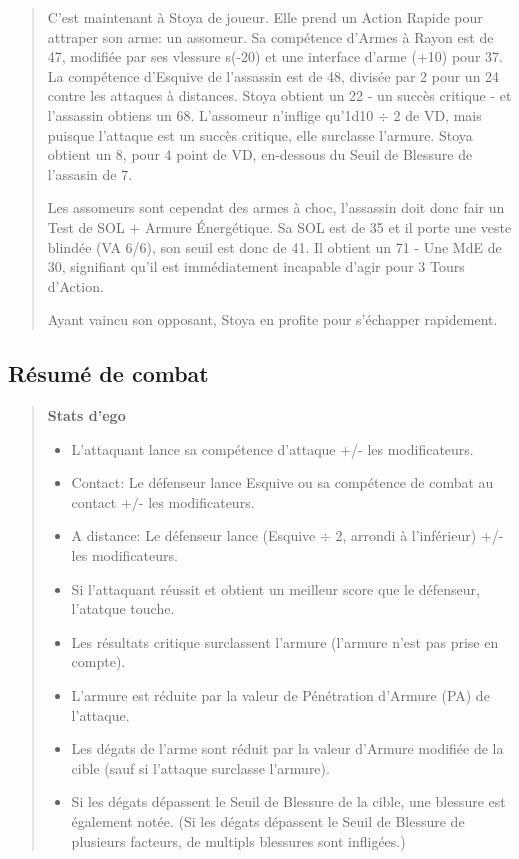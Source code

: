 \begin{quotation}
C'est maintenant à Stoya de joueur. Elle prend un Action Rapide pour attraper son arme: un assomeur. Sa compétence d'Armes à Rayon est de 47, modifiée par ses vlessure s(-20) et une interface d'arme (+10) pour 37. La compétence d'Esquive de l'assassin est de 48, divisée par 2 pour un 24 contre les attaques à distances. Stoya obtient un 22 - un succès critique - et l'assassin obtiens un 68. L'assomeur n'inflige qu'1d10 $\div$ 2 de VD, mais puisque l'attaque est un succès critique, elle surclasse l'armure. Stoya obtient un 8, pour 4 point de VD, en-dessous du Seuil de Blessure de l'assasin de 7. 

Les assomeurs sont cependat des armes à choc, l'assassin doit donc fair un Test de SOL + Armure Énergétique. Sa SOL est de 35 et il porte une veste blindée (VA 6/6), son seuil est donc de 41. Il obtient un 71 - Une MdE de 30, signifiant qu'il est immédiatement incapable d'agir pour 3 Tours d'Action. 

Ayant vaincu son opposant, Stoya en profite pour s'échapper rapidement. \end{quotation} 

\subsection{Résumé de combat} 

\begin{quotation} \textbf{Stats d'ego} \begin{itemize} \item L'attaquant lance sa compétence d'attaque +/- les modificateurs. \item Contact: Le défenseur lance Esquive ou sa compétence de combat au contact +/- les modificateurs. \item A distance: Le défenseur lance (Esquive $\div$ 2, arrondi à l'inférieur) +/- les modificateurs. \item Si l'attaquant réussit et obtient un meilleur score que le défenseur, l'atatque touche. \item Les résultats critique surclassent l'armure (l'armure n'est pas prise en compte). \item L'armure est réduite par la valeur de Pénétration d'Armure (PA) de l'attaque. \item Les dégats de l'arme sont réduit par la valeur d'Armure modifiée de la cible (sauf si l'attaque surclasse l'armure). \item Si les dégats dépassent le Seuil de Blessure de la cible, une blessure est également notée. (Si les dégats dépassent le Seuil de Blessure de plusieurs facteurs, de multipls blessures sont infligées.) \end{itemize} \end{quotation} 

